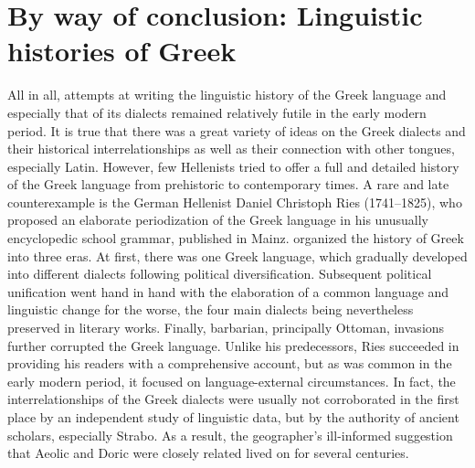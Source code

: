 \section{By way of conclusion: Linguistic histories of Greek}\label{sec:5.8}

All in all, attempts at writing the linguistic history of the Greek language and especially that of its dialects remained relatively futile in the early modern period. It is true that there was a great variety of ideas on the Greek dialects and their historical interrelationships as well as their connection with other tongues, especially Latin. However, few Hellenists tried to offer a full and detailed history of the Greek language from prehistoric to contemporary times. A rare and late counterexample is the German Hellenist Daniel Christoph Ries (1741–1825), who proposed an elaborate periodization of the Greek language in his unusually encyclopedic school grammar, published in Mainz. \citet[199--202]{Ries1786} organized the history of Greek into three eras. At first, there was one Greek language, which gradually developed into different dialects following political diversification. Subsequent political unification went hand in hand with the elaboration of a common language and linguistic change for the worse, the four main dialects being nevertheless preserved in literary works. Finally, barbarian, principally Ottoman, invasions further corrupted the Greek language. Unlike his predecessors, Ries succeeded in providing his readers with a comprehensive account, but as was common in the early modern period, it focused on language-external circumstances. In fact, the interrelationships of the Greek dialects were usually not corroborated in the first place by an independent study of linguistic data, but by the authority of ancient scholars, especially Strabo. As a result, the geographer’s ill-informed suggestion that Aeolic and Doric were closely related lived on for several centuries.

